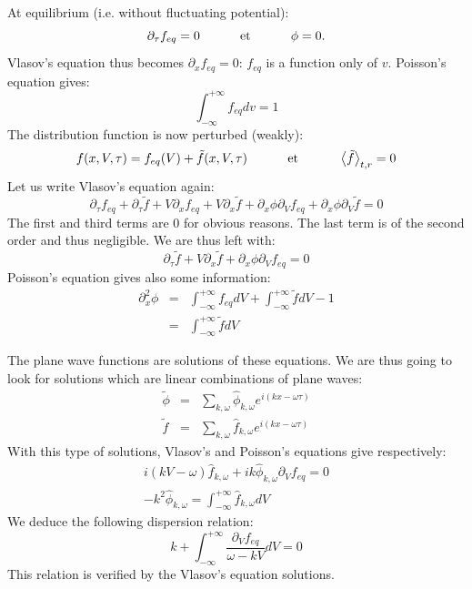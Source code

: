 At equilibrium (i.e. without fluctuating potential):
\[
		\partial_\tau f_{eq} = 0 \mbox{\hspace{1cm} et  \hspace{1cm}}  \phi = 0.
\]
Vlasov's equation thus becomes $\partial_x f_{eq} = 0$: $f_{eq}$ is a function only of $v$. Poisson's equation gives:
\[
		\int_{-\infty}^{+\infty} f_{eq} dv = 1
\]
The distribution function is now perturbed (weakly):
\[
		f(x,V,\tau) = f_{eq}(V) + \tilde{f} (x,V,\tau)		\mbox{\hspace{1cm} et  \hspace{1cm}}		\left< \tilde{f} \right>_{t,r} = 0
\]
Let us write Vlasov's equation again:
\[
		\partial_\tau f_{eq} + \partial_\tau \tilde{f} + V \partial_x f_{eq} + V \partial_x \tilde{f} + \partial_x\phi \partial_V f_{eq} + \partial_x\phi \partial_V \tilde{f} = 0
\]
The first and third terms are 0 for obvious reasons. The last term is of the second order and thus negligible. We are thus left with:
\[
		\partial_\tau \tilde{f} + V \partial_x \tilde{f} + \partial_x\phi \partial_V f_{eq} = 0
\]
Poisson's equation gives also some information:
\begin{eqnarray*}
		\partial_x^2\phi  &  =  &  \int_{-\infty}^{+\infty} f_{eq} dV  + \int_{-\infty}^{+\infty} \tilde{f} dV -1 \\
											&  =  &  \int_{-\infty}^{+\infty} \tilde{f} dV
\end{eqnarray*}

The plane wave functions are solutions of these equations. We are thus going to look for solutions which are linear combinations of plane waves:
\begin{eqnarray*}
		\tilde{\phi}		&		=		& \sum_{k,\omega} \hat{\phi}_{k,\omega} e^{i \left( kx - \omega \tau \right)}	\\
		\tilde{f}		&		=		& \sum_{k,\omega} \hat{f}_{k,\omega} e^{i \left( kx - \omega \tau \right)}
\end{eqnarray*}
With this type of solutions, Vlasov's and Poisson's equations give respectively:
\begin{eqnarray*}
		i\left( kV - \omega \right) \hat{f}_{k,\omega} + ik\hat{\phi}_{k,\omega} \partial_V f_{eq} = 0		\\
		-k^2\hat{\phi}_{k,\omega} = \int_{-\infty}^{+\infty} \hat{f}_{k,\omega} dV
\end{eqnarray*}
We deduce the following dispersion relation:
\begin{equation}
		k + \int_{-\infty}^{+\infty} \frac{\partial_V f_{eq}}{\omega - kV}dV = 0
\label{eq:dispersion}
\end{equation}
This relation is verified by the Vlasov's equation solutions.

